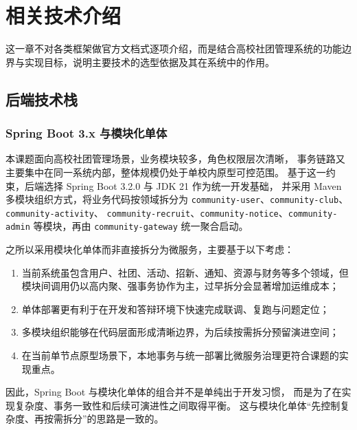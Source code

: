 ﻿%
\chapter{相关技术介绍}

这一章不对各类框架做官方文档式逐项介绍，而是结合高校社团管理系统的功能边界与实现目标，说明主要技术的选型依据及其在系统中的作用。

\section{后端技术栈}

\subsection{Spring Boot 3.x 与模块化单体}

本课题面向高校社团管理场景，业务模块较多，角色权限层次清晰，
事务链路又主要集中在同一系统内部，整体规模仍处于单校内原型可控范围。
基于这一约束，后端选择 Spring Boot 3.2.0 与 JDK 21 作为统一开发基础，
并采用 Maven 多模块组织方式，将业务代码按领域拆分为
\texttt{community-user}、\allowbreak\texttt{community-club}、\allowbreak\texttt{community-activity}、%
\allowbreak\texttt{community-recruit}、\allowbreak\texttt{community-notice}、\allowbreak\texttt{community-admin}
等模块，再由 \texttt{community-gateway}
统一聚合启动\cite{springboot_docs}。

之所以采用模块化单体而非直接拆分为微服务，主要基于以下考虑：
\begin{enumerate}
  \item 当前系统虽包含用户、社团、活动、招新、通知、资源与财务等多个领域，但模块间调用仍以高内聚、强事务协作为主，过早拆分会显著增加运维成本；
  \item 单体部署更有利于在开发和答辩环境下快速完成联调、复跑与问题定位；
  \item 多模块组织能够在代码层面形成清晰边界，为后续按需拆分预留演进空间；
  \item 在当前单节点原型场景下，本地事务与统一部署比微服务治理更符合课题的实现重点。
\end{enumerate}

因此，Spring Boot 与模块化单体的组合并不是单纯出于开发习惯，
而是为了在实现复杂度、事务一致性和后续可演进性之间取得平衡。
这与模块化单体“先控制复杂度、再按需拆分”的思路是一致的\cite{microservices2015,microservices_patterns2018}。

